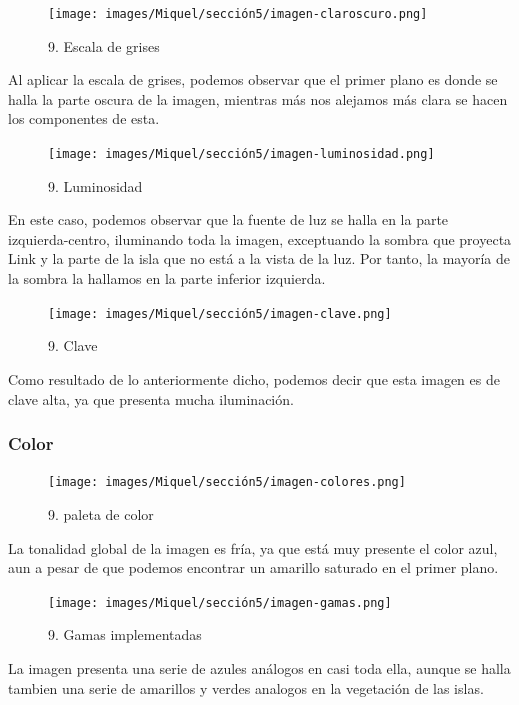 \documentclass[12pt]{article}
\begin{document}
    \begin{figure}[H]
      \centering
      \texttt{[image: images/Miquel/sección5/imagen-claroscuro.png]}
      \caption{\small 9. Escala de grises}
    \end{figure}

    Al aplicar la escala de grises, podemos observar que el primer plano es donde se halla la parte oscura de la imagen, mientras más nos alejamos más clara se hacen los componentes de esta.

    \begin{figure}[H]
      \centering
      \texttt{[image: images/Miquel/sección5/imagen-luminosidad.png]}
      \caption{\small 9. Luminosidad}
    \end{figure}

    En este caso, podemos observar que la fuente de luz se halla en la parte izquierda-centro, iluminando toda la imagen, exceptuando la sombra que proyecta Link y la parte de la isla que no está a la vista de la luz. Por tanto, la mayoría de la sombra la hallamos en la parte inferior izquierda.
    
   \begin{figure}[H]
      \centering
      \texttt{[image: images/Miquel/sección5/imagen-clave.png]}
      \caption{\small 9. Clave}
    \end{figure}

Como resultado de lo anteriormente dicho, podemos decir que esta imagen es de clave alta, ya que presenta mucha iluminación.

        \subsubsection{Color}

 \begin{figure}[H]
      \centering
      \texttt{[image: images/Miquel/sección5/imagen-colores.png]}
      \caption{\small 9. paleta de color}
    \end{figure}

     La tonalidad global de la imagen es fría, ya que está muy presente el color azul, aun a pesar de que podemos encontrar un amarillo saturado en el primer plano.  

\begin{figure}[H]
      \centering
      \texttt{[image: images/Miquel/sección5/imagen-gamas.png]}
      \caption{\small 9. Gamas implementadas}
    \end{figure}

    La imagen presenta una serie de azules análogos en casi toda ella, aunque se halla tambien una serie de amarillos y verdes analogos en la vegetación de las islas.
\end{document}
